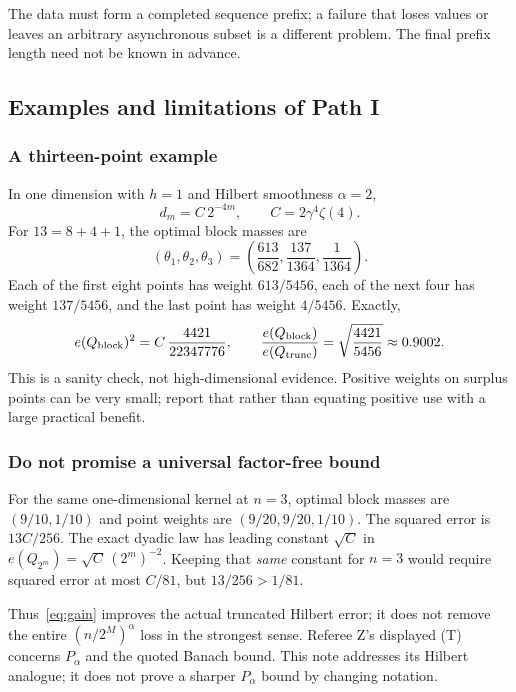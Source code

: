\documentclass[11pt]{article}
\begin{document}
The data must form a completed sequence prefix; a failure that loses
values or leaves an arbitrary asynchronous subset is a different
problem. The final prefix length need not be known in advance.

\subsection{Examples and limitations of Path I}
\subsubsection{A thirteen-point example}
In one dimension with $h=1$ and Hilbert smoothness $\alpha=2$,
\[
 d_m=C\,2^{-4m},\qquad C=2\gamma^4\zeta(4).
\]
For $13=8+4+1$, the optimal block masses are
\[
 (\theta_1,\theta_2,\theta_3)
 =\left(\frac{613}{682},\frac{137}{1364},\frac1{1364}\right).
\]
Each of the first eight points has weight $613/5456$,
each of the next four has weight $137/5456$,
and the last point has weight $4/5456$. Exactly,
\[
 e(Q_{\rm block})^2=C\,\frac{4421}{22347776},\qquad
 \frac{e(Q_{\rm block})}{e(Q_{\rm trunc})}
 =\sqrt{\frac{4421}{5456}}\approx0.9002.
\]
This is a sanity check, not high-dimensional evidence.
Positive weights on surplus points can be very small; report that
rather than equating positive use with a large practical benefit.

\subsubsection{Do not promise a universal factor-free bound}
For the same one-dimensional kernel at $n=3$, optimal block masses
are $(9/10,1/10)$ and point weights are $(9/20,9/20,1/10)$.
The squared error is $13C/256$.
The exact dyadic law has leading constant $\sqrt C$ in
$e(Q_{2^m})=\sqrt C\,(2^m)^{-2}$.
Keeping that \emph{same} constant for $n=3$ would require squared
error at most $C/81$, but $13/256>1/81$.

Thus~\eqref{eq:gain} improves the actual truncated Hilbert error;
it does not remove the entire $(n/2^M)^\alpha$ loss in the strongest
sense. Referee Z's displayed (T) concerns $P_\alpha$ and the quoted
Banach bound. This note addresses its Hilbert analogue; it does not
prove a sharper $P_\alpha$ bound by changing notation.
\end{document}
